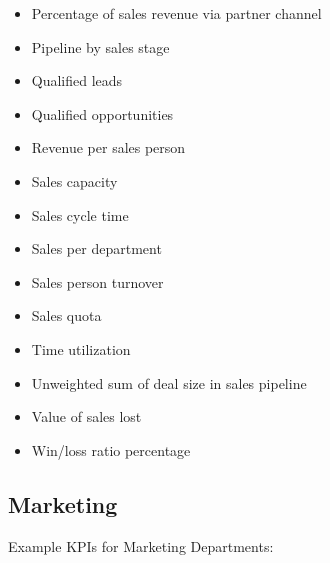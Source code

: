 \documentclass[]{book}
\begin{document}
\begin{itemize}
\item
  Percentage of sales revenue via partner channel
\item
  Pipeline by sales stage
\item
  Qualified leads
\item
  Qualified opportunities
\item
  Revenue per sales person
\item
  Sales capacity
\item
  Sales cycle time
\item
  Sales per department
\item
  Sales person turnover
\item
  Sales quota
\item
  Time utilization
\item
  Unweighted sum of deal size in sales pipeline
\item
  Value of sales lost
\item
  Win/loss ratio percentage
\end{itemize}

\subsection{Marketing}\label{marketing}

Example KPIs for Marketing Departments:
\end{document}
